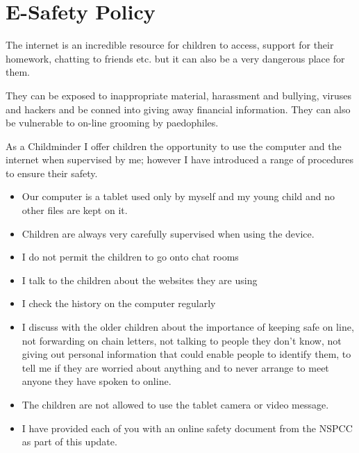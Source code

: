 
\section{E-Safety Policy}

The internet is an incredible resource for children to access, support
for their homework, chatting to friends etc. but it can also be a very
dangerous place for them.

They can be exposed to inappropriate material, harassment and
bullying, viruses and hackers and be conned into giving away financial
information. They can also be vulnerable to on-line grooming by
paedophiles.

As a Childminder I offer children the opportunity to use the computer
and the internet when supervised by me; however I have introduced a
range of procedures to ensure their safety.


\begin{itemize}

\item
Our computer is a tablet used only by myself and my young child and no
other files are kept on it.

\item
Children are always very carefully supervised when using the device.

\item
I do not permit the children to go onto chat rooms

\item
I talk to the children about the websites they are using

\item
I check the history on the computer regularly

\item
I discuss with the older children about the importance of keeping safe
on line, not forwarding on chain letters, not talking to people they
don’t know, not giving out personal information that could enable
people to identify them, to tell me if they are worried about anything
and to never arrange to meet anyone they have spoken to online.

\item
The children are not allowed to use the tablet camera or video
message.

\item
I have provided each of you with an online safety document from the
NSPCC as part of this update.

\end{itemize}

